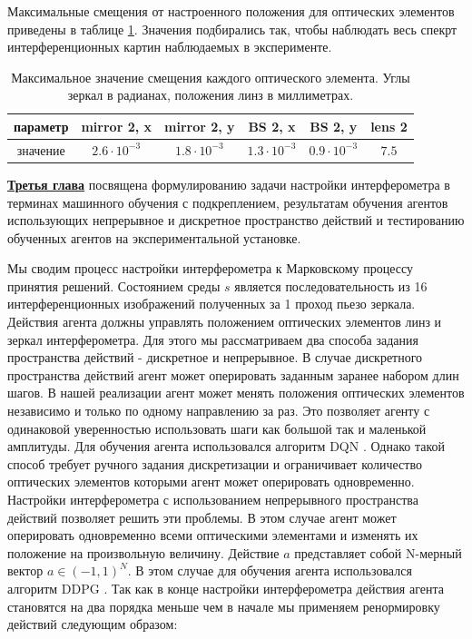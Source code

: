 Максимальные смещения от настроенного положения для оптических элементов приведены в таблице \ref{tab:interf_dyn_params}. Значения подбирались так, чтобы наблюдать весь спекрт интерференционных картин наблюдаемых в эксперименте.

\begin{table} [htbp]
    \centering
    \begin{threeparttable}%
        \caption{Максимальное значение смещения каждого оптического элемента. Углы зеркал в радианах, положения линз в миллиметрах.}
        \begin{tabular}{|c|c|c|c|c|c|}
            \hline
            \hline
            параметр & mirror 2, x & mirror 2, y & BS 2, x & BS 2, y & lens 2 \\
            \hline
            значение & $2.6 \cdot 10^{-3}$ & $1.8 \cdot 10^{-3}$ & $1.3 \cdot 10^{-3}$ & $0.9 \cdot 10^{-3}$ & $7.5$ \\
            \hline
            \hline
        \end{tabular}
        \label{tab:interf_dyn_params}
    \end{threeparttable}
\end{table}


\underline{\textbf{Третья глава}} посвящена формулированию задачи настройки интерферометра в терминах машинного обучения с подкреплением, результатам обучения агентов использующих непрерывное и дискретное пространство действий и тестированию обученных агентов на экспериментальной установке. 

Мы сводим процесс настройки интерферометра к Марковскому процессу принятия решений. Состоянием среды $s$ является последовательность из 16 интерференционных изображений полученных за 1 проход пьезо зеркала. Действия агента должны управлять положением оптических элементов линз и зеркал интерферометра. Для этого мы рассматриваем два способа задания пространства действий - дискретное и непрерывное. В случае дискретного пространства действий агент может оперировать заданным заранее набором длин шагов. В нашей реализации агент может менять положения оптических элементов независимо и только по одному направлению за раз. Это позволяет агенту с одинаковой уверенностью использовать шаги как большой так и маленькой амплитуды. Для обучения агента использовался алгоритм DQN \cite{dqn}.  Однако такой способ требует ручного задания дискретизации и ограничивает количество оптических элементов которыми агент может оперировать одновременно. Настройки интерферометра с использованием непрерывного пространства действий позволяет решить эти проблемы. В этом случае агент может оперировать одновременно всеми оптическими элементами и изменять их положение на произвольную величину. Действие $a$ представляет собой N-мерный вектор $a \in (-1, 1)^{N}$. 
В этом случае для обучения агента использовался алгоритм DDPG \cite{ddpg}.
Так как в конце настройки интерферометра действия агента становятся на два порядка меньше чем в начале мы применяем ренормировку действий следующим образом: 


